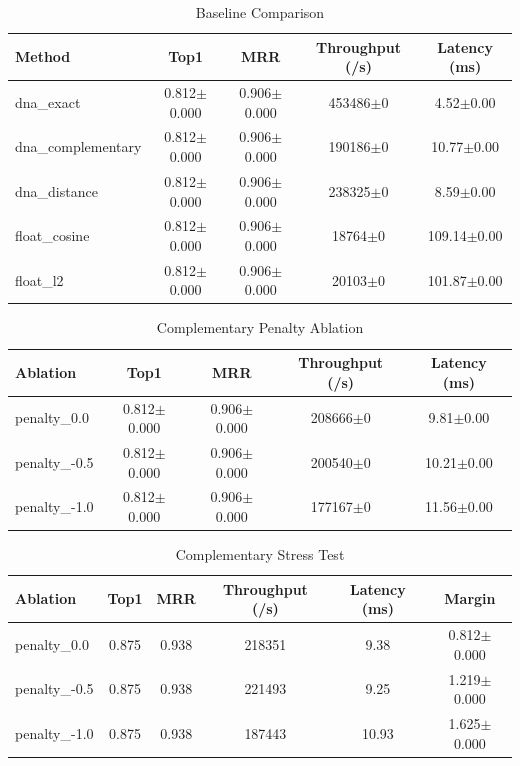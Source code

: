 \begin{table}[t]
\centering
\caption{Baseline Comparison}
\begin{tabular}{lcccc}
\hline
Method & Top1 & MRR & Throughput (/s) & Latency (ms) \\
\hline
dna_exact & 0.812$\pm$0.000 & 0.906$\pm$0.000 & 453486$\pm$0 & 4.52$\pm$0.00 \\
dna_complementary & 0.812$\pm$0.000 & 0.906$\pm$0.000 & 190186$\pm$0 & 10.77$\pm$0.00 \\
dna_distance & 0.812$\pm$0.000 & 0.906$\pm$0.000 & 238325$\pm$0 & 8.59$\pm$0.00 \\
float_cosine & 0.812$\pm$0.000 & 0.906$\pm$0.000 & 18764$\pm$0 & 109.14$\pm$0.00 \\
float_l2 & 0.812$\pm$0.000 & 0.906$\pm$0.000 & 20103$\pm$0 & 101.87$\pm$0.00 \\
\hline
\end{tabular}
\end{table}

\begin{table}[t]
\centering
\caption{Complementary Penalty Ablation}
\begin{tabular}{lcccc}
\hline
Ablation & Top1 & MRR & Throughput (/s) & Latency (ms) \\
\hline
penalty_0.0 & 0.812$\pm$0.000 & 0.906$\pm$0.000 & 208666$\pm$0 & 9.81$\pm$0.00 \\
penalty_-0.5 & 0.812$\pm$0.000 & 0.906$\pm$0.000 & 200540$\pm$0 & 10.21$\pm$0.00 \\
penalty_-1.0 & 0.812$\pm$0.000 & 0.906$\pm$0.000 & 177167$\pm$0 & 11.56$\pm$0.00 \\
\hline
\end{tabular}
\end{table}

\begin{table}[t]
\centering
\caption{Complementary Stress Test}
\begin{tabular}{lccccc}
\hline
Ablation & Top1 & MRR & Throughput (/s) & Latency (ms) & Margin \\
\hline
penalty_0.0 & 0.875 & 0.938 & 218351 & 9.38 & 0.812$\pm$0.000 \\
penalty_-0.5 & 0.875 & 0.938 & 221493 & 9.25 & 1.219$\pm$0.000 \\
penalty_-1.0 & 0.875 & 0.938 & 187443 & 10.93 & 1.625$\pm$0.000 \\
\hline
\end{tabular}
\end{table}